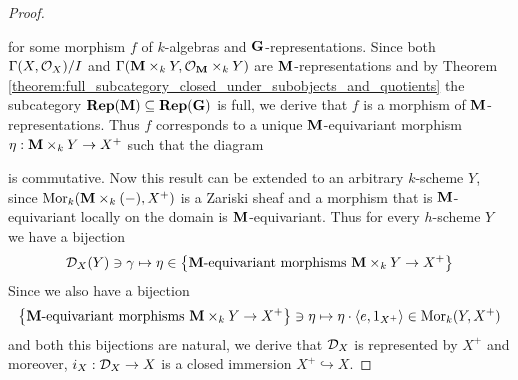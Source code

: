 \begin{proof}
\begin{center}
\end{center}
for some morphism $f$ of $k$-algebras and $\mathbf{G}$-representations. Since both $\Gamma(X,{\mathcal O}_X)/I$ and $\Gamma(\mathbf{M}\times_kY,{\mathcal O}_{\mathbf{M}}\times_kY)$ are $\mathbf{M}$-representations and by Theorem \ref{theorem:full_subcategory_closed_under_subobjects_and_quotients} the subcategory $\mathbf{Rep}(\mathbf{M})\subseteq \mathbf{Rep}(\mathbf{G})$ is full, we derive that $f$ is a morphism of $\mathbf{M}$-representations. Thus $f$ corresponds to a unique $\mathbf{M}$-equivariant morphism $\eta:\mathbf{M}\times_kY\rightarrow X^+$ such that the diagram
\begin{center}
\end{center}
is commutative. Now this result can be extended to an arbitrary $k$-scheme $Y$, since $\mathrm{Mor}_k(\mathbf{M}\times_k(-),X^+)$ is a Zariski sheaf and a morphism that is $\mathbf{M}$-equivariant locally on the domain is $\mathbf{M}$-equivariant. Thus for every $h$-scheme $Y$ we have a bijection
$${\mathcal D}_X(Y)\ni \gamma \mapsto \eta \in \big\{\mathbf{M}\mbox{-equivariant morphisms }\mathbf{M}\times_kY\rightarrow X^+\big\}$$
Since we also have a bijection
$$\big\{\mathbf{M}\mbox{-equivariant morphisms }\mathbf{M}\times_kY\rightarrow X^+\big\}\ni \eta \mapsto \eta\cdot \langle e, 1_{X^+}\rangle \in \mathrm{Mor}_k(Y,X^+)$$
and both this bijections are natural, we derive that ${\mathcal D}_X$ is represented by $X^+$ and moreover, $i_X:{\mathcal D}_X\rightarrow X$ is a closed immersion $X^+\hookrightarrow X$.
\end{proof}

